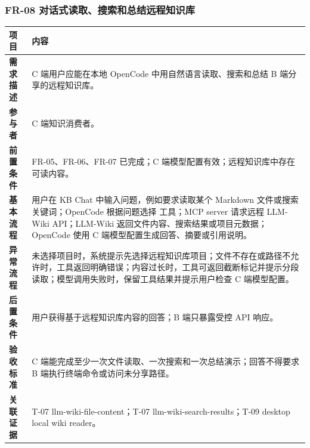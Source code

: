\documentclass[UTF8,a4paper,12pt,fontset=fandol]{ctexart}
\newcommand{\code}[1]{\texorpdfstring{\begingroup\footnotesize\detokenize{#1}\endgroup}{#1}}
\begin{document}
\subsubsection{FR-08 对话式读取、搜索和总结远程知识库}
\begin{longtable}{>{\bfseries}p{2.4cm}p{11.8cm}}
\toprule
项目 & 内容 \\
\midrule
需求描述 & C 端用户应能在本地 OpenCode 中用自然语言读取、搜索和总结 B 端分享的远程知识库。 \\
参与者 & C 端知识消费者。 \\
前置条件 & FR-05、FR-06、FR-07 已完成；C 端模型配置有效；远程知识库中存在可读内容。 \\
基本流程 & 用户在 KB Chat 中输入问题，例如要求读取某个 Markdown 文件或搜索关键词；OpenCode 根据问题选择 \code{llm_wiki_*} 工具；MCP server 请求远程 LLM-Wiki API；LLM-Wiki 返回文件内容、搜索结果或项目元数据；OpenCode 使用 C 端模型配置生成回答、摘要或引用说明。 \\
异常流程 & 未选择项目时，系统提示先选择远程知识库项目；文件不存在或路径不允许时，工具返回明确错误；内容过长时，工具可返回截断标记并提示分段读取；模型调用失败时，保留工具结果并提示用户检查 C 端模型配置。 \\
后置条件 & 用户获得基于远程知识库内容的回答；B 端只暴露受控 API 响应。 \\
验收标准 & C 端能完成至少一次文件读取、一次搜索和一次总结演示；回答不得要求 B 端执行终端命令或访问未分享路径。 \\
关联证据 & T-07 llm-wiki-file-content；T-07 llm-wiki-search-results；T-09 desktop local wiki reader。 \\
\bottomrule
\end{longtable}
\end{document}
